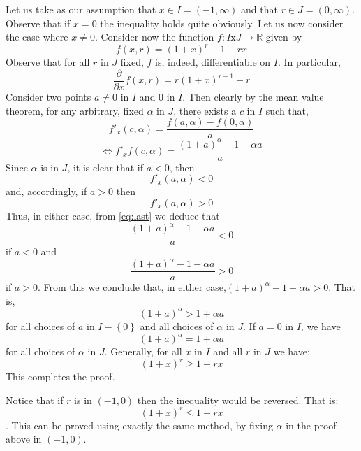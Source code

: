 \documentclass[12pt]{article}
\begin{document}
Let us take as our assumption that $x \in I = \left(-1,
\infty\right)$ and that $r \in J = \left(0, \infty\right)$. Observe
that if $x = 0$ the inequality holds quite obviously. Let us now
consider the case where $x \neq 0$. \linebreak
Consider now the
function $f: I\text{x}J\rightarrow\mathbb{R}$ given by
$$f(x,r) = (1 + x)^r - 1 - rx$$ Observe that for all $r$ in $J$
fixed, $f$ is, indeed, differentiable on $I$. In particular,
$$\frac{\partial}{{\partial}x}f(x,r) = r(1+x)^{r-1}-r$$ Consider
two points $a \neq 0$ in $I$ and $0$ in $I$. Then clearly by the
mean value theorem, for any arbitrary, fixed $\alpha$ in $J$, there
exists a $c$ in $I$ such that,
$$f'_x(c, \alpha) = \frac{f(a, \alpha) - f(0, \alpha)}{a}$$
\begin{equation}
\Leftrightarrow f'_xf(c,
\alpha)=\frac{(1+a)^\alpha-1-{\alpha}a}{a}\label{eq:last}
\end{equation}
Since $\alpha$ is in $J$, it is clear that if $a < 0$, then
$$f'_x(a,\alpha) < 0$$
and, accordingly, if $a > 0$ then
$$f'_x(a,\alpha) > 0$$
Thus, in either case, from {\ref{eq:last}} we deduce that
$$\frac{(1+a)^\alpha-1-{\alpha}a}{a} < 0$$ if $a < 0$ and
$$\frac{(1+a)^\alpha-1-{\alpha}a}{a} > 0$$ if $a > 0$. From this we
conclude that, in either case,$(1+a)^\alpha-1-{\alpha}a > 0$. That
is, $$(1 + a)^\alpha > 1+{\alpha}a$$ for all choices of $a$ in $I -
\left\{0\right\}$ and all choices of $\alpha$ in $J$. If $a = 0$ in
$I$, we have$$(1 + a)^\alpha = 1+{\alpha}a$$ for all choices of
$\alpha$ in $J$. Generally, for all $x$ in $I$ and all $r$ in $J$ we
have:
$$(1+x)^r \geq 1 + rx$$
This completes the proof.

Notice that if $r$ is in $\left(-1, 0\right)$ then the inequality would be reversed. That is: $$(1+x)^r \leq 1 + rx$$. This can be proved using exactly the same method, by fixing $\alpha$ in the proof above in $\left(-1, 0\right)$.
\end{document}
